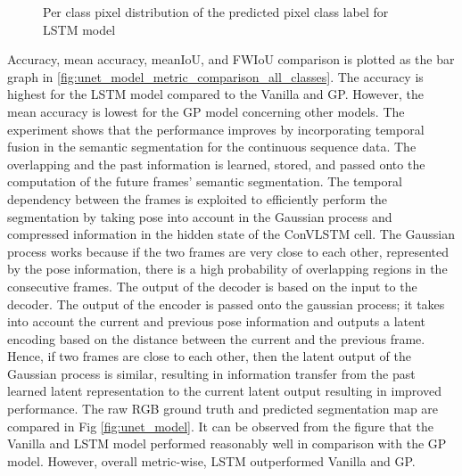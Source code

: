 	\begin{figure}%
		\centering
		\qquad
		\caption{Per class pixel distribution of the predicted pixel class label for LSTM model}%
		\label{fig:y_gt_and_predic_lstm}%
	\end{figure}

	Accuracy, mean accuracy, meanIoU, and FWIoU comparison is plotted as the bar graph in \ref{fig:unet_model_metric_comparison_all_classes}. The accuracy is highest for the LSTM model compared to the Vanilla and GP. However, the mean accuracy is lowest for the GP model concerning other models. The experiment shows that the performance improves by incorporating temporal fusion in the semantic segmentation for the continuous sequence data. The overlapping and the past information is learned, stored, and passed onto the computation of the future frames' semantic segmentation. The temporal dependency between the frames is exploited to efficiently perform the segmentation by taking pose into account in the Gaussian process and compressed information in the hidden state of the ConVLSTM cell. The Gaussian process works because if the two frames are very close to each other, represented by the pose information, there is a high probability of overlapping regions in the consecutive frames. The output of the decoder is based on the input to the decoder. The output of the encoder is passed onto the gaussian process; it takes into account the current and previous pose information and outputs a latent encoding based on the distance between the current and the previous frame. Hence, if two frames are close to each other, then the latent output of the Gaussian process is similar, resulting in information transfer from the past learned latent representation to the current latent output resulting in improved performance. The raw RGB ground truth and predicted segmentation map are compared in Fig \ref{fig:unet_model}. It can be observed from the figure that the Vanilla and LSTM model performed reasonably well in comparison with the GP model. However, overall metric-wise, LSTM outperformed Vanilla and GP.   
	

